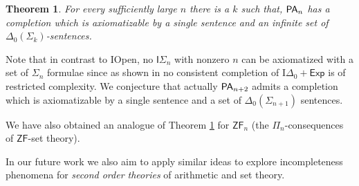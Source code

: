 \documentclass{amsart}
\newtheorem{theorem}{Theorem}[section]
\newcommand{\pa}{{\sf PA}}
\newcommand{\iopen}{{\sf IOpen}}
\begin{document}
 \begin{theorem}\label{thm_pan}
    For every sufficiently large $n$ there is a $k$ such that, $\pa_n$ has a completion which is axiomatizable by a single sentence and an infinite set of $\Delta_0(\Sigma_{k})$-sentences. 
    \end{theorem}

    Note that in contrast to \iopen, no ${\mathsf{I}}\Sigma_n$ with nonzero $n$ can be axiomatized with a set of $\Sigma_n$ formulae since as shown in \cite{Enayat-Visser2024} no consistent completion of $\mathrm{I}\Delta_0+\mathsf{Exp}$ is of restricted complexity. We conjecture that actually $\pa_{n+2}$ admits a completion which is axiomatizable by a single sentence and a set of $\Delta_0(\Sigma_{n+1})$ sentences.

   We have also obtained an analogue of Theorem \ref{thm_pan} for $\mathsf{ZF}_n$ (the $\Pi_n$-consequences of $\mathsf{ZF}$-set theory).

In our future work we also aim to apply similar ideas to explore incompleteness phenomena for \emph{second order theories} of arithmetic and set theory. 
\end{document}

